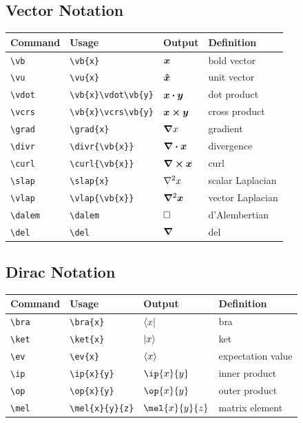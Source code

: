 \documentclass[11pt]{article}
\begin{document}
\subsection{Vector Notation}

\begin{tabular}{llll}
    Command       & Usage                      & Output                & Definition       \\
    \hline
    \verb|\vb|    & \verb|\vb{x}|              & $\bm{x}$              & bold vector      \\
    \verb|\vu|    & \verb|\vu{x}|              & $\bm{\hat{x}}$              & unit vector      \\
    \verb|\vdot|  & \verb|\vb{x}\vdot\vb{y}|   & $\bm{x}\bm{\cdot}\bm{y}$   & dot product      \\
    \verb|\vcrs|  & \verb|\vb{x}\vcrs\vb{y}|   & $\bm{x}\bm{\times}\bm{y}$   & cross product    \\
    \verb|\grad|  & \verb|\grad{x}|            & $\bm{\nabla} x$            & gradient         \\
    \verb|\divr|  & \verb|\divr{\vb{x}}|       & $\bm{\nabla} \bm{\cdot} \bm{x}$       & divergence       \\
    \verb|\curl|  & \verb|\curl{\vb{x}}|       & $\bm{\nabla} \bm{\times} \bm{x}$       & curl             \\
    \verb|\slap|  & \verb|\slap{x}|            & $\nabla^{2} x$            & scalar Laplacian \\
    \verb|\vlap|  & \verb|\vlap{\vb{x}}|       & $\bm{\nabla}^{2} \bm{x}$       & vector Laplacian \\
    \verb|\dalem| & \verb|\dalem|              & $\dalem$              & d'Alembertian    \\
    \verb|\del|   & \verb|\del|                & $\bm{\nabla}$                & del              \\
\end{tabular}

\subsection{Dirac Notation}

\begin{tabular}{llll}
    Command     & Usage                & Output          & Definition        \\
    \hline
    \verb|\bra| & \verb|\bra{x}|       & $\langle x\rvert$       & bra               \\
    \verb|\ket| & \verb|\ket{x}|       & $\lvert x\rangle$       & ket               \\
    \verb|\ev|  & \verb|\ev{x}|        & $\langle x\rangle$        & expectation value \\
    \verb|\ip|  & \verb|\ip{x}{y}|     & $\ip{x}{y}$     & inner product     \\
    \verb|\op|  & \verb|\op{x}{y}|     & $\op{x}{y}$     & outer product     \\
    \verb|\mel| & \verb|\mel{x}{y}{z}| & $\mel{x}{y}{z}$ & matrix element    \\
\end{tabular}
\end{document}
